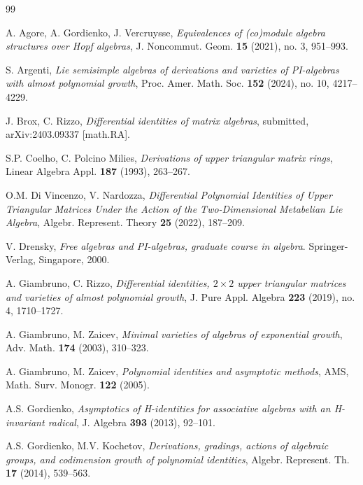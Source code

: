 \documentclass[a4paper,reqno]{amsart}
\theoremstyle{definition}
\numberwithin{equation}{section}
\numberwithin{theorem}{section}
\begin{document}
\begin{thebibliography}{99}


 A. Agore, A.  Gordienko, J. Vercruysse, {\em 
Equivalences of (co)module algebra structures over Hopf algebras}, J. Noncommut. Geom. {\bf 15} (2021), no. 3, 951--993.

 S. Argenti, {\em Lie semisimple algebras of derivations and varieties of PI-algebras with almost polynomial growth}, Proc. Amer. Math. Soc. \textbf{152} (2024), no. 10, 4217--4229.


 J. Brox, C. Rizzo, {\em Differential identities of matrix algebras}, submitted, arXiv:2403.09337 [math.RA].



	 S.P. Coelho, C. Polcino Milies, {\em Derivations of upper triangular matrix rings}, Linear Algebra Appl. {\bf 187} (1993), 263--267.


     O.M. Di Vincenzo, V. Nardozza, {\em Differential Polynomial Identities of Upper Triangular Matrices Under the Action of the Two-Dimensional Metabelian Lie Algebra}, Algebr. Represent. Theory {\bf 25} (2022), 187--209.


      V. Drensky, {\em Free algebras and PI-algebras, graduate course in algebra}. Springer-Verlag, Singapore, 2000.

      A. Giambruno, C. Rizzo, {\em Differential identities, $2\times 2$ upper triangular matrices and varieties of almost polynomial growth}, J. Pure Appl. Algebra {\bf 223} (2019), no. 4, 1710--1727.

      A. Giambruno, M. Zaicev, {\em Minimal varieties of algebras of exponential growth}, Adv. Math. {\bf 174} (2003),
310--323.

  A. Giambruno, M. Zaicev, {\em Polynomial identities and asymptotic methods}, AMS, Math. Surv. Monogr. {\bf 122} (2005).

 



   A.S. Gordienko, {\em Asymptotics of H-identities for associative algebras with an H-invariant radical}, J. Algebra {\bf 393} (2013), 92--101.

   A.S. Gordienko, M.V. Kochetov, {\em Derivations, gradings, actions of algebraic groups, and codimension growth of polynomial identities}, Algebr. Represent. Th. {\bf 17} (2014), 539--563.
  


\end{thebibliography}
\end{document}
